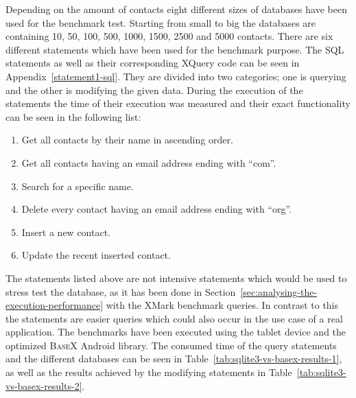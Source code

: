 Depending on the amount of contacts eight different sizes of databases have been used for the benchmark test.
Starting from small to big the databases are containing 10, 50, 100, 500, 1000, 1500, 2500 and 5000 contacts.
There are six different statements which have been used for the benchmark purpose.
The SQL statements as well as their corresponding XQuery code can be seen in Appendix~\ref{statement1-sql}.
They are divided into  two categories; one is querying and the other is modifying the given data.
During the execution of the statements the time of their execution was measured and their exact functionality can be seen in the following list:
\newpage
\begin{enumerate}
	\item Get all contacts by their name in ascending order.
	\item Get all contacts having an email address ending with ``com''.
	\item Search for a specific name.
	\item Delete every contact having an email address ending with ``org''.
	\item Insert a new contact.
	\item Update the recent inserted contact.
\end{enumerate}
The statements listed above are not intensive statements which would be used to stress test the database, as it has been done in Section~\ref{sec:analysing-the-execution-performance} with the XMark benchmark queries.
In contrast to this the statements are easier queries which could also occur in the use case of a real application.
The benchmarks have been executed using the tablet device and the optimized \textsc{BaseX} Android library.
The consumed time of the query statements and the different databases can be seen in Table~\ref{tab:sqlite3-vs-basex-results-1}, as well as the results achieved by the modifying statements in Table~\ref{tab:sqlite3-vs-basex-results-2}.


